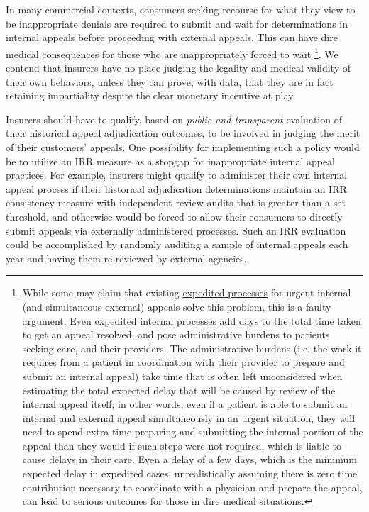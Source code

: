 \documentclass[12pt, a4paper,twoside,parskip=full]{report}
\theoremstyle{plain} %
\theoremstyle{definition} %
\theoremstyle{remark} %
\numberwithin{equation}{chapter}
\begin{document}
		In many commercial contexts, consumers seeking recourse for what they view to be inappropriate denials are required 
		to submit and wait for determinations in internal appeals before proceeding with external appeals. This can have
		dire medical consequences for those who are inappropriately forced to wait \footnote{While some may claim that existing \href{https://www.healthcare.gov/marketplace-appeals/expedited-appeal/}{expedited processes} for urgent internal (and simultaneous external) appeals solve this problem, this is a faulty argument. Even expedited internal processes add days 
			to the total time taken to get an appeal resolved, and pose administrative burdens to patients seeking care, and their providers. The administrative 
			burdens (i.e. the work it requires from a patient in coordination with their provider to prepare and submit an internal appeal) take time that is often 
			left unconsidered when estimating the total expected delay that will be caused by review of the internal appeal itself; in other words, even if a patient 
			is able to submit an internal and external appeal simultaneously in an urgent situation, they will need to spend extra time preparing and submitting the 
			internal portion of the appeal than they would if such steps were not required, which is liable to cause delays in their care. Even a delay of a few days,
			which is the minimum expected delay in expedited cases, unrealistically assuming there is zero time contribution necessary to coordinate with a physician 
			and prepare the appeal, can lead to serious outcomes for those in dire medical situations.}. We contend that insurers have no 
		place judging the legality and medical validity of their own behaviors, unless they can prove, with data, that 
		they are in fact retaining impartiality despite the clear monetary incentive at play.
		
		Insurers should have to qualify, based on \emph{public and transparent} evaluation of their historical
		appeal adjudication outcomes, to be involved in judging the merit of their customers' appeals. One possibility for 
		implementing such a policy would be to utilize an IRR measure as a stopgap for inappropriate internal appeal 
		practices. For example, insurers might qualify to administer their own internal appeal process if their historical 
		adjudication determinations maintain an IRR consistency measure with independent review audits that is greater than 
		a set threshold, and otherwise would be forced to allow their consumers to directly submit appeals via externally 
		administered processes. Such an IRR evaluation could
		be accomplished by randomly auditing
		a sample of internal appeals each year and having them re-reviewed by external agencies.
		
\end{document}
